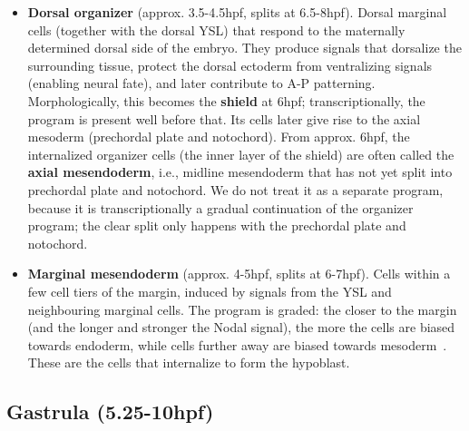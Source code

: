\documentclass[11pt,a4paper]{article}
\begin{document}
\begin{itemize}
	\item \textbf{Dorsal organizer} (approx. 3.5-4.5hpf, splits at 6.5-8hpf). Dorsal marginal cells (together with the dorsal YSL) that respond to the maternally determined dorsal side of the embryo. They produce signals that dorsalize the surrounding tissue, protect the dorsal ectoderm from ventralizing signals (enabling neural fate), and later contribute to A-P patterning. Morphologically, this becomes the \textbf{shield} at 6hpf; transcriptionally, the program is present well before that. Its cells later give rise to the axial mesoderm (prechordal plate and notochord). From approx. 6hpf, the internalized organizer cells (the inner layer of the shield) are often called the \textbf{axial mesendoderm}, i.e., midline mesendoderm that has not yet split into prechordal plate and notochord. We do not treat it as a separate program, because it is transcriptionally a gradual continuation of the organizer program; the clear split only happens with the prechordal plate and notochord.
	\item \textbf{Marginal mesendoderm} (approx. 4-5hpf, splits at 6-7hpf). Cells within a few cell tiers of the margin, induced by signals from the YSL and neighbouring marginal cells. The program is graded: the closer to the margin (and the longer and stronger the Nodal signal), the more the cells are biased towards endoderm, while cells further away are biased towards mesoderm~\cite{hagos2007}. These are the cells that internalize to form the hypoblast.
\end{itemize}

\subsection{Gastrula (5.25-10hpf)}
\end{document}

